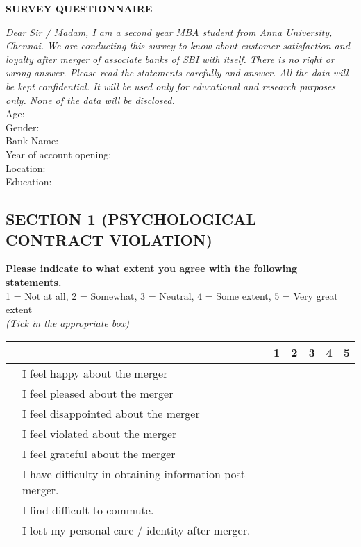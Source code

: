 \documentclass[12pt,a4paper]{extarticle}
\newcounter{magicrownumbers}
\newcommand\rownumber{\stepcounter{magicrownumbers}\arabic{magicrownumbers}}
\newcommand \tab[1][1cm]{\hspace*{#1}}
\begin{document}
{\selectfont
\begin{center}
\textbf{SURVEY QUESTIONNAIRE}
\end{center}
\emph{Dear Sir / Madam, I am a second year MBA student from Anna University, Chennai. We are conducting this survey to know about customer satisfaction and loyalty after merger of associate banks of SBI with itself. There is no right or wrong answer. Please read the statements carefully and answer. All the data will be kept confidential. It will be used only for educational and research purposes only. None of the data will be disclosed.}\\
\noindent\makebox[\linewidth]{\rule{\paperwidth}{0.4pt}}
Age:\\
Gender:\\
Bank Name:\\
Year of account opening:\\
Location:\\
Education:\\
\noindent\makebox[\linewidth]{\rule{\paperwidth}{0.4pt}}

\subsection*{SECTION 1 (PSYCHOLOGICAL CONTRACT VIOLATION)}
\textbf{Please indicate to what extent you agree with the following statements.} \\
1 = Not at all, 2 = Somewhat, 3 = Neutral, 4 = Some extent, 5 = Very great extent\\
\emph {(Tick in the appropriate box)}\\
\begin{minipage}{\textwidth}

\begin{tabular}{|c|l|c|c|c|c|c|}
\hline \multicolumn{2}{|c|}{} & 1 & 2 & 3 & 4 & 5\\
\hline \rownumber & I feel happy about the merger & \tab & \tab & \tab & \tab & \tab \\
\hline \rownumber & I feel pleased about the merger & \tab & \tab & \tab & \tab & \tab \\
\hline \rownumber & I feel disappointed about the merger & \tab & \tab & \tab & \tab & \tab \\
\hline \rownumber & I feel violated about the merger & \tab & \tab & \tab & \tab & \tab \\
\hline \rownumber & I feel grateful about the merger & \tab & \tab & \tab & \tab & \tab \\
\hline \rownumber & I have difficulty in obtaining information post merger. & \tab & \tab & \tab & \tab & \tab \\
\hline \rownumber & I find difficult to commute. & \tab & \tab & \tab & \tab & \tab \\
\hline \rownumber & I lost my personal care / identity after merger. & \tab & \tab & \tab & \tab & \tab \\
\hline
\end{tabular}


\end{minipage}}
\end{document}
